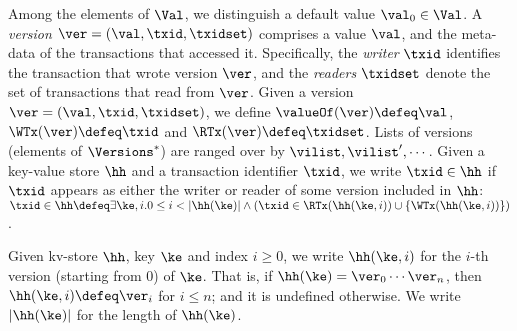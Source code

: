 Among the elements of $\Val$, we distinguish a default value $\val_0 \in \Val$. 
A \emph{version} $\ver = (\val, \txid, \txidset)$ comprises a value $\val$,
and the meta-data of the transactions that accessed it.
Specifically, the \emph{writer} $\txid$ identifies the transaction that wrote version $\ver$, 
and the \emph{readers} $\txidset$ denote the set of transactions that read from $\ver$.
Given a version $\ver = (\val, \txid, \txidset)$, we define $\valueOf(\ver) \defeq \val$,
$\WTx(\ver) \defeq \txid$ and $\RTx(\ver) \defeq \txidset$. 
Lists of versions (\ie elements of $\Versions^{\ast}$) are ranged over by $\vilist, \vilist',\cdots$.
Given a key-value store $\hh$ and a transaction identifier $\txid$, we write 
$\txid \in \hh$ if $\txid$ appears as either the writer or reader of 
some version included in $\hh$:  $\txid \in \hh \defeq 
\exists \ke, i. 0 \leq i < \lvert \hh(\ke) \rvert \wedge (\txid \in \RTx(\hh(\ke, i)) \cup \{\WTx(\hh(\ke, i))\})$.

Given kv-store $\hh$, key $\ke$ and index $i \geq 0$, 
we write $\hh(\ke, i)$ for the $i$-th version (starting from $0$) of $\ke$.
That is, if $\hh(\ke) = \ver_0 \cdots\ver_{n}$, then $\hh(\ke, i) \defeq \ver_{i}$ for $i \leq n$; 
and it is undefined otherwise. 
We write $\lvert \hh(\ke) \rvert$ for the length of $\hh(\ke)$. 

